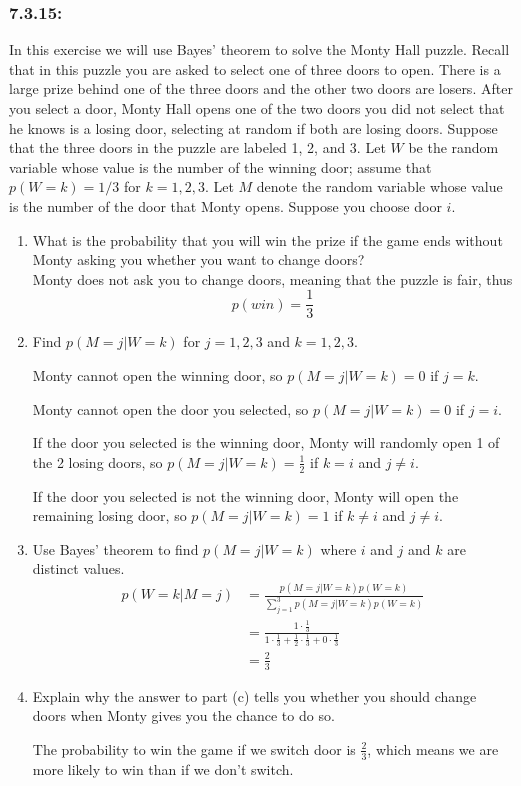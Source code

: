 \documentclass[a4paper]{article}
\begin{document}
\subsubsection*{7.3.15:}
In this exercise we will use Bayes' theorem to solve the Monty Hall puzzle. Recall that in this puzzle you are asked to select one of three doors to open. There is a large prize behind one of the three doors and the other two doors are losers. After you select a door, Monty Hall opens one of the two doors you did not select that he knows is a losing door, selecting at random if both are losing doors. Suppose that the three doors in the puzzle are labeled 1, 2, and 3. Let $W$ be the random variable whose value is the number of the winning door; assume that $p(W=k) = 1/3$ for $k=1,2,3$. Let $M$ denote the random variable whose value is the number of the door that Monty opens. Suppose you choose door $i$.
\begin{enumerate}[label = \textbf{\alph*)}]
	\item What is the probability that you will win the prize if the game ends without Monty asking you whether you want to change doors? \\
	      Monty does not ask you to change doors, meaning that the puzzle is fair, thus
	      \begin{equation*}
		      p(win) = \frac{1}{3}
	      \end{equation*}
	\item Find $p(M=j|W=k)$ for $j=1,2,3$ and $k=1,2,3$.
	      
	      Monty cannot open the winning door, so $p(M=j|W=k) = 0$ if $j=k$.
	      
	      Monty cannot open the door you selected, so $p(M=j|W=k) = 0$ if $j=i$.
	      
	      If the door you selected is the winning door, Monty will randomly open 1 of the 2 losing doors, so $p(M=j|W=k) = \frac{1}{2}$ if $k=i$ and $j \neq i$.
	      
	      If the door you selected is not the winning door, Monty will open the remaining losing door, so $p(M=j|W=k) = 1$ if $k \neq i$ and $j \neq i$.
	\item Use Bayes' theorem to find $p(M=j|W=k)$ where $i$ and $j$ and $k$ are distinct values.
	      \begin{align*}
		      p(W=k|M=j) & = \frac{p(M=j|W=k) p(W=k)}{\sum_{j=1}^{3}p(M=j|W=k) p(W=k)}                                             \\
		                 & = \frac{1 \cdot \frac{1}{3}}{1 \cdot \frac{1}{3} + \frac{1}{2} \cdot \frac{1}{3} + 0 \cdot \frac{1}{3}} \\
		                 & = \frac{2}{3}
	      \end{align*}
	\item Explain why the answer to part (c) tells you whether you should change doors when Monty gives you the chance to do so.
	      
	      The probability to win the game if we switch door is $\frac{2}{3}$, which means we are more likely to win than if we don't switch.
\end{enumerate}
\end{document}
